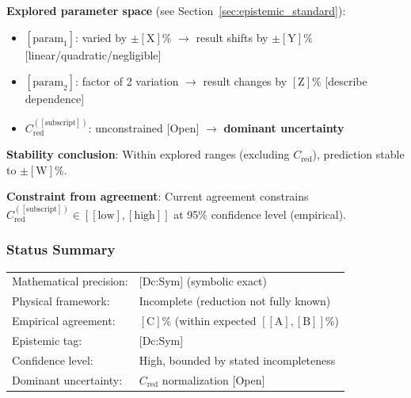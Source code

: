 \textbf{Explored parameter space} (see Section~\ref{sec:epistemic_standard}):

\begin{itemize}
\item $[\text{param}_1]$: varied by $\pm [\text{X}]\%$ 
  $\to$ result shifts by $\pm [\text{Y}]\%$ [linear/quadratic/negligible]

\item $[\text{param}_2]$: factor of 2 variation 
  $\to$ result changes by $[\text{Z}]\%$ [describe dependence]

\item $C_{\mathrm{red}}^{([\text{subscript}])}$: unconstrained [Open] 
  $\to$ \textbf{dominant uncertainty}
\end{itemize}

\textbf{Stability conclusion}:
Within explored ranges (excluding $C_{\mathrm{red}}$), prediction stable to $\pm [\text{W}]\%$.

\textbf{Constraint from agreement}:
Current agreement constrains $C_{\mathrm{red}}^{([\text{subscript}])} \in [[\text{low}], [\text{high}]]$ 
at 95\% confidence level (empirical).


\subsubsection{Status Summary}

\begin{center}
\begin{tabular}{ll}
\hline
Mathematical precision: & [Dc:Sym] (symbolic exact) \\
Physical framework: & Incomplete (reduction not fully known) \\
Empirical agreement: & $[\text{C}]\%$ (within expected $[[\text{A}], [\text{B}]]\%$) \\
Epistemic tag: & [Dc:Sym] \\
Confidence level: & High, bounded by stated incompleteness \\
Dominant uncertainty: & $C_{\mathrm{red}}$ normalization [Open] \\
\hline
\end{tabular}
\end{center}


